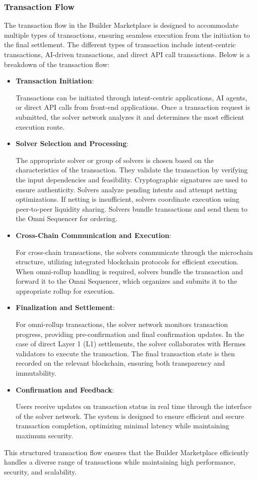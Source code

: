 \subsubsection{Transaction Flow}
The transaction flow in the Builder Marketplace is designed to accommodate multiple types of transactions, ensuring seamless execution from the initiation to the final settlement. The different types of transaction include intent-centric transactions, AI-driven transactions, and direct API call transactions. Below is a breakdown of the transaction flow:
\begin{itemize}
    \item \textbf{Transaction Initiation}:

    Transactions can be initiated through intent-centric applications, AI agents, or direct API calls from front-end applications. Once a transaction request is submitted, the solver network analyzes it and determines the most efficient execution route.

    \item \textbf{Solver Selection and Processing}:

    The appropriate solver or group of solvers is chosen based on the characteristics of the transaction. They validate the transaction by verifying the input dependencies and feasibility. Cryptographic signatures are used to ensure authenticity. Solvers analyze pending intents and attempt netting optimizations. If netting is insufficient, solvers coordinate execution using peer-to-peer liquidity sharing.
    Solvers bundle transactions and send them to the Omni Sequencer for ordering.

    \item \textbf{Cross-Chain Communication and Execution}:

    For cross-chain transactions, the solvers communicate through the microchain structure, utilizing integrated blockchain protocols for efficient execution. When omni-rollup handling is required, solvers bundle the transaction and forward it to the Omni Sequencer, which organizes and submits it to the appropriate rollup for execution.

    \item \textbf{Finalization and Settlement}:

    For omni-rollup transactions, the solver network monitors transaction progress, providing pre-confirmation and final confirmation updates. In the case of direct Layer 1 (L1) settlements, the solver collaborates with Hermes validators to execute the transaction. The final transaction state is then recorded on the relevant blockchain, ensuring both transparency and immutability.
    
    \item \textbf{Confirmation and Feedback}:
    
    Users receive updates on transaction status in real time through the interface of the solver network. The system is designed to ensure efficient and secure transaction completion, optimizing minimal latency while maintaining maximum security.
\end{itemize}

    
This structured transaction flow ensures that the Builder Marketplace efficiently handles a diverse range of transactions while maintaining high performance, security, and scalability.